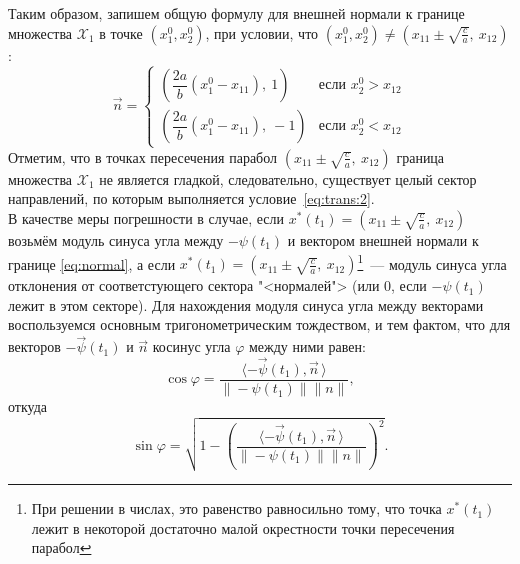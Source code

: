 \documentclass[11pt, oneside, final]{article}
\theoremstyle{break}
\numberwithin{equation}{section}
\theoremstyle{plain}
\theoremstyle{definition}
\newcommand{\scalar}[2]{\langle #1, #2\,\rangle}
\begin{document}
    Таким образом, запишем общую формулу для внешней нормали к границе множества \(\mathcal{X}_1\) в точке \(\left(x_1^0, x_2^0\right)\), при условии, что \(\left(x_1^0, x_2^0\right) \neq \left(x_{11} \pm \sqrt{\frac{c}{a}}, \: x_{12} \right)\):
    \begin{equation}
        \label{eq:normal}
        \vec n =
        \begin{cases}
            \left( \dfrac{2a}{b} (x_1^0 - x_{11}), \: 1 \right)& \text{если } x_2^0 > x_{12} \\
            \left( \dfrac{2a}{b} (x_1^0 - x_{11}), \: -1 \right)& \text{если } x_2^0 < x_{12}
        \end{cases}
    \end{equation}
    Отметим, что в точках пересечения парабол \(\left(x_{11} \pm \sqrt{\frac{c}{a}}, \: x_{12} \right)\) граница множества \(\mathcal{X}_1\) не является гладкой, следовательно, существует целый сектор направлений, по которым выполняется условие~\eqref{eq:trans:2}. \\
    В качестве меры погрешности в случае, если \(x^{*}(t_1) = \left(x_{11} \pm \sqrt{\frac{c}{a}}, \: x_{12} \right)\) возьмём модуль синуса угла между \(-\psi(t_1) \) и вектором внешней нормали к границе \eqref{eq:normal}, а если \(x^{*}(t_1) = \left(x_{11} \pm \sqrt{\frac{c}{a}}, \: x_{12} \right)\)\footnote{При решении в числах, это равенство равносильно тому, что точка \(x^{*}(t_1)\) лежит в некоторой достаточно малой окрестности точки пересечения парабол}~--- модуль синуса угла отклонения от соответстующего сектора "<нормалей"> (или 0, если \(-\psi(t_1)\) лежит в этом секторе). Для нахождения модуля синуса угла между векторами воспользуемся основным тригонометрическим тождеством, и тем фактом, что для векторов \(- \vec\psi(t_1) \text{ и } \vec n  \) косинус угла \(\varphi\) между ними равен: 
    \[\cos\varphi = \dfrac{\scalar{- \vec\psi(t_1)}{\vec n}}{\|-\psi(t_1)\| \|n\|}, \]
    откуда 
    \[\sin\varphi = \sqrt{1 - \left(\dfrac{\scalar{- \vec\psi(t_1)}{\vec n}}{\|-\psi(t_1)\| \|n\|}\right)^2}.\]
\end{document}
